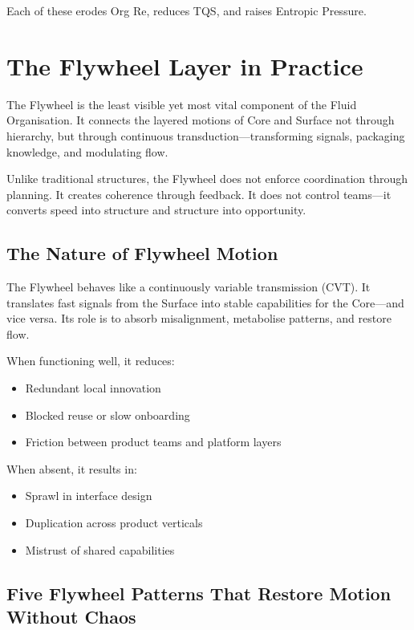 \documentclass[12pt]{article}
\begin{document}
Each of these erodes Org Re, reduces TQS, and raises Entropic Pressure.

\section{The Flywheel Layer in Practice}

The Flywheel is the least visible yet most vital component of the Fluid Organisation. It connects the layered motions of Core and Surface not through hierarchy, but through continuous transduction---transforming signals, packaging knowledge, and modulating flow.

Unlike traditional structures, the Flywheel does not enforce coordination through planning. It creates coherence through feedback. It does not control teams---it converts speed into structure and structure into opportunity.

\subsection*{The Nature of Flywheel Motion}

The Flywheel behaves like a continuously variable transmission (CVT). It translates fast signals from the Surface into stable capabilities for the Core---and vice versa. Its role is to absorb misalignment, metabolise patterns, and restore flow.

When functioning well, it reduces:
\begin{itemize}
    \item Redundant local innovation
    \item Blocked reuse or slow onboarding
    \item Friction between product teams and platform layers
\end{itemize}

When absent, it results in:
\begin{itemize}
    \item Sprawl in interface design
    \item Duplication across product verticals
    \item Mistrust of shared capabilities
\end{itemize}

\subsection*{Five Flywheel Patterns That Restore Motion\\Without Chaos}
\end{document}
